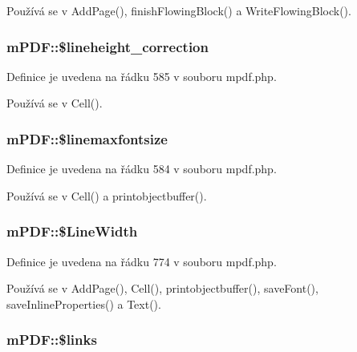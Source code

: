 Používá se v Add\-Page(), finish\-Flowing\-Block() a Write\-Flowing\-Block().

\hypertarget{classm_p_d_f_a57c57171287efccba72f73dcc55e02e2}{
\subsubsection[{\$lineheight\-\_\-correction}]{\setlength{\rightskip}{0pt plus 5cm}m\-P\-D\-F\-::\$lineheight\-\_\-correction}}\label{classm_p_d_f_a57c57171287efccba72f73dcc55e02e2}


Definice je uvedena na řádku 585 v souboru mpdf.\-php.



Používá se v Cell().

\hypertarget{classm_p_d_f_a77f6a729dae7f7cc778427e45113b40b}{
\subsubsection[{\$linemaxfontsize}]{\setlength{\rightskip}{0pt plus 5cm}m\-P\-D\-F\-::\$linemaxfontsize}}\label{classm_p_d_f_a77f6a729dae7f7cc778427e45113b40b}


Definice je uvedena na řádku 584 v souboru mpdf.\-php.



Používá se v Cell() a printobjectbuffer().

\hypertarget{classm_p_d_f_a420b684001b9cdc610695aab6f8a61e9}{
\subsubsection[{\$\-Line\-Width}]{\setlength{\rightskip}{0pt plus 5cm}m\-P\-D\-F\-::\$\-Line\-Width}}\label{classm_p_d_f_a420b684001b9cdc610695aab6f8a61e9}


Definice je uvedena na řádku 774 v souboru mpdf.\-php.



Používá se v Add\-Page(), Cell(), printobjectbuffer(), save\-Font(), save\-Inline\-Properties() a Text().

\hypertarget{classm_p_d_f_a0eaa65f03f86406b3bfd3a7bcbcb4028}{
\subsubsection[{\$links}]{\setlength{\rightskip}{0pt plus 5cm}m\-P\-D\-F\-::\$links}}\label{classm_p_d_f_a0eaa65f03f86406b3bfd3a7bcbcb4028}


